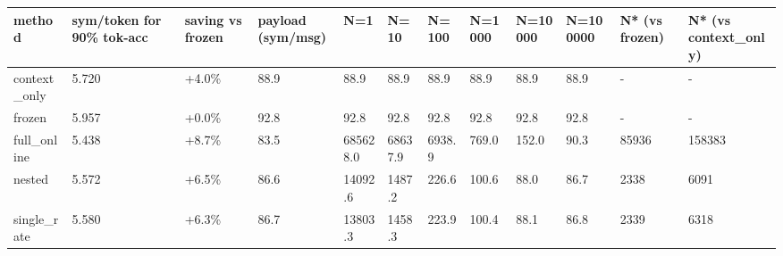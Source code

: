 \begin{tabular}{llllllllllll}
\hline
method & sym/token for 90\% tok-acc & saving vs frozen & payload (sym/msg) & N=1 & N=10 & N=100 & N=1000 & N=10000 & N=100000 & N* (vs frozen) & N* (vs context\_only) \\
\hline
context\_only & 5.720 & +4.0\% & 88.9 & 88.9 & 88.9 & 88.9 & 88.9 & 88.9 & 88.9 & - & - \\
frozen & 5.957 & +0.0\% & 92.8 & 92.8 & 92.8 & 92.8 & 92.8 & 92.8 & 92.8 & - & - \\
full\_online & 5.438 & +8.7\% & 83.5 & 685628.0 & 68637.9 & 6938.9 & 769.0 & 152.0 & 90.3 & 85936 & 158383 \\
nested & 5.572 & +6.5\% & 86.6 & 14092.6 & 1487.2 & 226.6 & 100.6 & 88.0 & 86.7 & 2338 & 6091 \\
single\_rate & 5.580 & +6.3\% & 86.7 & 13803.3 & 1458.3 & 223.9 & 100.4 & 88.1 & 86.8 & 2339 & 6318 \\
\hline
\end{tabular}
